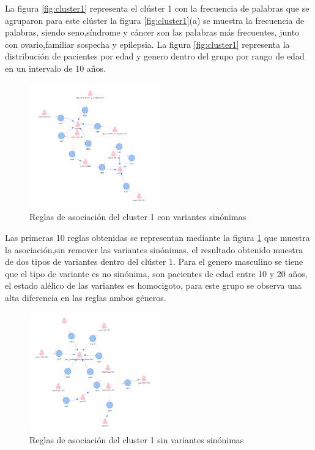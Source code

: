 La figura \ref{fig:cluster1} representa el clúster 1 con la frecuencia de palabras que se agruparon para este clúster  la figura \ref{fig:cluster1}(a) se muestra la frecuencia de palabras, siendo seno,síndrome y cáncer son las palabras más frecuentes, junto con ovario,familiar sospecha y epilepsia. La figura \ref{fig:cluster1} representa la distribución de pacientes por edad y genero dentro del grupo por rango de edad en un intervalo de 10 años.\\

\begin{figure}[]
	\centering
	\includegraphics[width=0.5\textwidth]{Kap4/reglas1_1}
	\caption{Reglas de asociación del cluster 1 con variantes sinónimas} \label{fig:reglas1}
\end{figure}

Las primeras 10 reglas obtenidas se representan mediante la figura \ref{fig:reglas1} que muestra la asociación,sin remover las variantes sinónimas, el resultado obtenido muestra de dos tipos de variantes dentro del clúster 1. Para el genero masculino  se tiene que el tipo de variante es no sinónima, son pacientes de edad entre 10 y 20 años, el estado alélico de las variantes es homocigoto, para este grupo se observa una alta diferencia en las reglas ambos géneros.

\begin{figure}[H]
	\centering
	\includegraphics[width=0.5\textwidth]{Kap4/reglas1_2}
	\caption{Reglas de asociación del cluster 1 sin variantes sinónimas} \label{fig:reglas2}
\end{figure}


